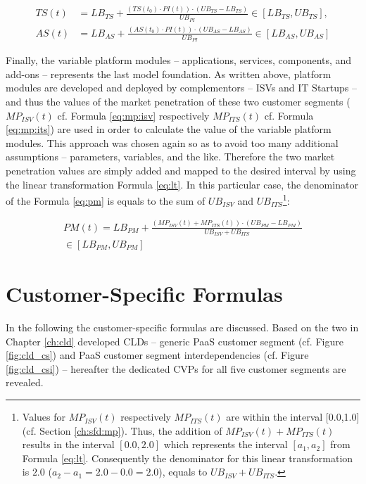 \begin{align}
	TS(t) &= LB_{TS} +  \frac{(TS(t_0) \cdot PI(t)) \cdot (UB_{TS} - LB_{TS})}{UB_{PI}} \in [LB_{TS},UB_{TS}],\label{eq:ts}\\
	AS(t) &= LB_{AS} +  \frac{(AS(t_0) \cdot PI(t)) \cdot (UB_{AS} - LB_{AS})}{UB_{PI}} \in [LB_{AS},UB_{AS}]\label{eq:as}
\end{align} 

Finally, the variable platform modules -- applications, services, components, and add-ons -- represents the last model foundation. As written above, platform modules are developed and deployed by complementors -- \acp{ISV} and \ac{IT} Startups -- and thus the values of the market penetration of these two customer segments ($MP_{ISV}(t)$ cf. Formula \ref{eq:mp:isv} respectively $MP_{ITS}(t)$ cf. Formula \ref{eq:mp:its}) are used in order to calculate the value of the variable platform modules. This approach was chosen again so as to avoid too many additional assumptions -- parameters, variables, and the like. Therefore the two market penetration values are simply added and mapped to the desired interval by using the linear transformation Formula \ref{eq:lt}. In this particular case, the denominator of the Formula \ref{eq:pm} is equals to the sum of $UB_{ISV}$ and $UB_{ITS}$\footnote{Values for $MP_{ISV}(t)$ respectively $MP_{ITS}(t)$ are within the interval [0.0,1.0] (cf. Section \ref{ch:sfd:mp}). Thus, the addition of $MP_{ISV}(t) + MP_{ITS}(t)$ results in the interval $[0.0,2.0]$ which represents the interval $[a_1,a_2]$ from Formula \ref{eq:lt}. Consequently the denominator for this linear transformation is $2.0$ ($a_2 - a_1 = 2.0 - 0.0 = 2.0$), equals to $UB_{ISV} + UB_{ITS}$.}:

\begin{eqnarray}\label{eq:pm}
	PM(t) = LB_{PM} + \frac{(MP_{ISV}(t) + MP_{ITS}(t)) \cdot (UB_{PM} - LB_{PM})}{UB_{ISV} + UB_{ITS}} \nonumber \\ \in [LB_{PM},UB_{PM}]
\end{eqnarray}

\section{Customer-Specific Formulas}\label{ch:sfd:csf}

In the following the customer-specific formulas are discussed. Based on the two in Chapter \ref{ch:cld} developed \acp{CLD} -- generic \ac{PaaS} customer segment (cf. Figure \ref{fig:cld_cs}) and \ac{PaaS} customer segment interdependencies (cf. Figure \ref{fig:cld_csi}) -- hereafter the dedicated \acp{CVP} for all five customer segments are revealed.

